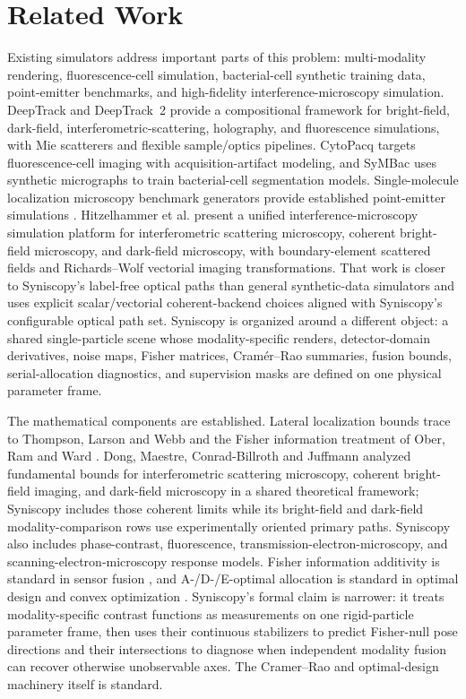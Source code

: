 \section{Related Work}
\label{sec:related}

Existing simulators address important parts of this problem: multi-modality rendering, fluorescence-cell simulation, bacterial-cell synthetic training data, point-emitter benchmarks, and high-fidelity interference-microscopy simulation. DeepTrack and DeepTrack~2 \cite{deeptrack} provide a compositional framework for bright-field, dark-field, interferometric-scattering, holography, and fluorescence simulations, with Mie scatterers and flexible sample/optics pipelines. CytoPacq \cite{cytopacq} targets fluorescence-cell imaging with acquisition-artifact modeling, and SyMBac \cite{symbac} uses synthetic micrographs to train bacterial-cell segmentation models. Single-molecule localization microscopy benchmark generators provide established point-emitter simulations \cite{smlm-simulator}. Hitzelhammer et al. \cite{hitzelhammer-interference-platform} present a unified interference-microscopy simulation platform for interferometric scattering microscopy, coherent bright-field microscopy, and dark-field microscopy, with boundary-element scattered fields and Richards--Wolf vectorial imaging transformations. That work is closer to Syniscopy's label-free optical paths than general synthetic-data simulators and uses explicit scalar/vectorial coherent-backend choices aligned with Syniscopy's configurable optical path set. Syniscopy is organized around a different object: a shared single-particle scene whose modality-specific renders, detector-domain derivatives, noise maps, Fisher matrices, Cram\'{e}r--Rao summaries, fusion bounds, serial-allocation diagnostics, and supervision masks are defined on one physical parameter frame.

The mathematical components are established. Lateral localization bounds trace to Thompson, Larson and Webb \cite{thompson-larson-webb} and the Fisher information treatment of Ober, Ram and Ward \cite{ober-ram-ward}. Dong, Maestre, Conrad-Billroth and Juffmann \cite{juffmann-iscat-cobri-crlb} analyzed fundamental bounds for interferometric scattering microscopy, coherent bright-field imaging, and dark-field microscopy in a shared theoretical framework; Syniscopy includes those coherent limits while its bright-field and dark-field modality-comparison rows use experimentally oriented primary paths. Syniscopy also includes phase-contrast, fluorescence, transmission-electron-microscopy, and scanning-electron-microscopy response models. Fisher information additivity is standard in sensor fusion \cite{fisher-fusion}, and A-/D-/E-optimal allocation is standard in optimal design and convex optimization \cite{pukelsheim-optimal-design,boyd-convex}. Syniscopy's formal claim is narrower: it treats modality-specific contrast functions as measurements on one rigid-particle parameter frame, then uses their continuous stabilizers to predict Fisher-null pose directions and their intersections to diagnose when independent modality fusion can recover otherwise unobservable axes. The Cramer--Rao and optimal-design machinery itself is standard.

